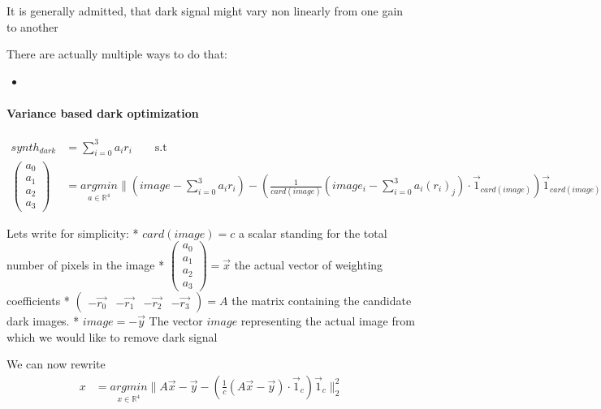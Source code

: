 \documentclass{article}
\begin{document}
    It is generally admitted, that dark signal might vary non linearly from one gain to another


    There are actually multiple ways to do that:
    \begin{itemize}
     \item 
    \end{itemize}
    
    \paragraph{Variance based dark optimization}
    \begin{align*}
	synth_{dark} &= \sum_{i=0}^{3} a_i r_i \qquad \text{s.t} \\
	      \begin{pmatrix} a_0\\ a_1\\ a_2\\ a_3\end{pmatrix} &= \underset{a \in \mathbb{R}^4}{argmin} \| \left(image - \sum_{i=0}^{3} a_i r_i \right) - \left( \frac{1}{card(image)} \left(image_i - \sum_{i=0}^{3} a_i (r_i)_j \right) \cdot \vec{1}_{card(image)} \right) \vec{1}_{card(image)} \|_2^2
    \end{align*}

    Lets write for simplicity:
    * $card(image) = c$ a scalar standing for the total number of pixels in the image
    * $\begin{pmatrix} a_0\\ a_1\\ a_2\\ a_3\end{pmatrix} = \vec{x}$ the actual vector of weighting coefficients
    * $\begin{pmatrix} -\vec{r_0} & -\vec{r_1} & -\vec{r_2} & -\vec{r_3}\end{pmatrix} = A$ the matrix containing the candidate dark images.
    * $image = -\vec{y}$ The vector $image$ representing the actual image from which we would like to remove dark signal

    We can now rewrite
    \begin{align*}
	      x &= \underset{x \in \mathbb{R}^4}{argmin} \| A\vec{x}-\vec{y} - \left(\frac{1}{c} (A\vec{x}-\vec{y})\cdot\vec{1}_{c} \right) \vec{1}_{c} \|_2^2 \\
    \end{align*}
\end{document}
